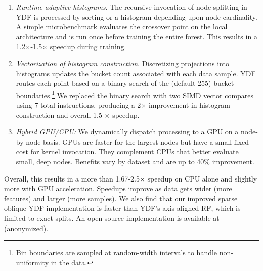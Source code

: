 \documentclass[sigconf]{acmart}
\begin{document}
\begin{enumerate}
    \item \textit{Runtime-adaptive histograms}. The recursive invocation of node-splitting in YDF is processed by sorting or a histogram depending upon node cardinality. A simple microbenchmark 
    evaluates the crossover point on the local architecture and is run once before training the entire forest. This results in a 1.2$\times$-1.5$\times$  speedup during training.
    
    \item \textit{Vectorization of histogram construction}. Discretizing projections into histograms updates the bucket count associated with each data sample. YDF routes each point based on a binary search of the (default 255) bucket boundaries.\footnote{Bin boundaries are sampled at random-width intervals to handle non-uniformity in the data.} We replaced the binary search with two SIMD vector compares using 7 total instructions, producing a 2$\times$ improvement in histogram construction and overall 1.5 $\times$ speedup.
    
    \item \textit{Hybrid GPU/CPU:} We dynamically dispatch processing to a GPU on a node-by-node basis. GPUs are faster for the largest nodes but have a small-fixed cost for kernel invocation. They complement CPUs that better evaluate small, deep nodes. Benefits vary by dataset and are up to 40\% improvement.
\end{enumerate}
\noindent Overall, this results in a more than 1.67-2.5$\times$ speedup on CPU alone and slightly more with  GPU acceleration. Speedups improve as data gets wider (more features) and larger (more samples). We also find that our improved sparse oblique YDF implementation is faster than YDF's axis-aligned RF, which is limited to exact splits. An open-source implementation is available at (anonymized). %
\end{document}
